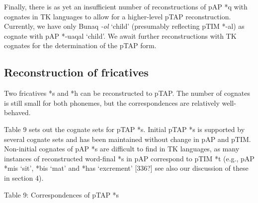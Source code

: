 Finally, there is as yet an insufficient number of reconstructions of pAP *q with cognates in TK languages to allow for a higher-level pTAP reconstruction. Currently, we have only Bunaq \textit{{}-ol} {\textquoteleft}child{\textquoteright} (presumably reflecting pTIM *-al) as cognate with pAP *-uaqal {\textquoteleft}child{\textquoteright}. We await further reconstructions with TK cognates for the determination of the pTAP form.

\subsection[Reconstruction of fricatives]{\textbf{Reconstruction of fricatives}}
\hypertarget{RefHeading65413871885726}{}Two fricatives *s and *h can be reconstructed to pTAP. The number of cognates is still small for both phonemes, but the correspondences are relatively well-behaved. 

Table 9 sets out the cognate sets for pTAP *s. Initial pTAP *s is supported by several cognate sets and has been maintained without change in pAP and pTIM. Non-initial cognates of pAP *s are difficult to find in TK languages, as many instances of reconstructed word-final *s in pAP correspond to pTIM *t (e.g., pAP *mis {\textquoteleft}sit{\textquoteright}, *bis {\textquoteleft}mat{\textquoteright} and *has {\textquoteleft}excrement{\textquoteright}  [336?]  see also our discussion of these in section 4).

{\centering
Table 9: Correspondences of pTAP *s
\par}


